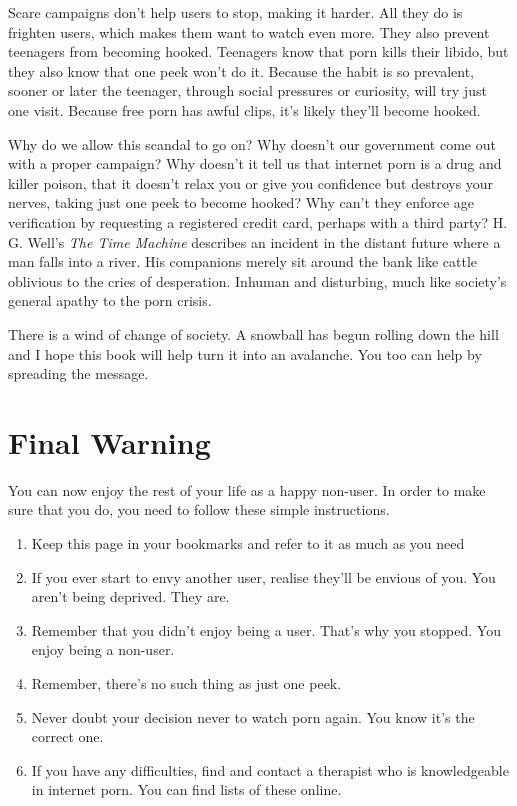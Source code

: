 \documentclass[easypeasy.tex]{subfiles}
\begin{document}
Scare campaigns don't help users to stop, making it harder. All they do is frighten users, which makes them want to watch even more. They also prevent teenagers from becoming hooked. Teenagers know that porn kills their libido, but they also know that one peek won't do it. Because the habit is so prevalent, sooner or later the teenager, through social pressures or curiosity, will try just one visit. Because free porn has awful clips, it's likely they'll become hooked.

Why do we allow this scandal to go on? Why doesn't our government come out with a proper campaign? Why doesn't it tell us that internet porn is a drug and killer poison, that it doesn't relax you or give you confidence but destroys your nerves, taking just one peek to become hooked? Why can't they enforce age verification by requesting a registered credit card, perhaps with a third party? H. G. Well's \textit{The Time Machine} describes an incident in the distant future where a man falls into a river. His companions merely sit around the bank like cattle oblivious to the cries of desperation. Inhuman and disturbing, much like society's general apathy to the porn crisis.

There is a wind of change of society. A snowball has begun rolling down the hill and I hope this book will help turn it into an avalanche. You too can help by spreading the message.

\section{Final Warning}

You can now enjoy the rest of your life as a happy non-user. In order to make sure that you do, you need to follow these simple instructions.
\begin{enumerate}
  \item Keep this page in your bookmarks and refer to it as much as you need
  \item If you ever start to envy another user, realise they'll be envious of you. You aren't being deprived. They are.
  \item Remember that you didn't enjoy being a user. That's why you stopped. You enjoy being a non-user.
  \item Remember, there's no such thing as just one peek.
  \item Never doubt your decision never to watch porn again. You know it's the correct one.
  \item If you have any difficulties, find and contact a therapist who is knowledgeable in internet porn. You can find lists of these online.
\end{enumerate}
\end{document}

